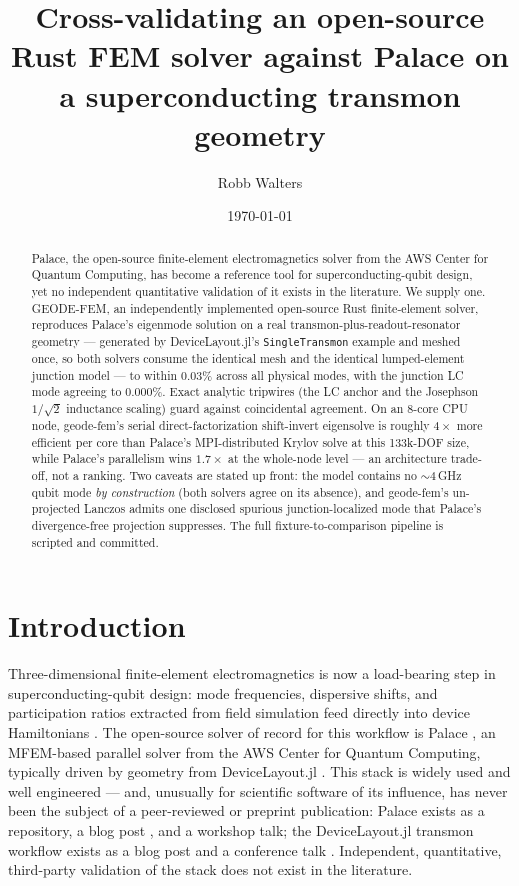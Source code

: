 \documentclass{anvil-paper}
\title{Cross-validating an open-source Rust FEM solver against Palace on a
superconducting transmon geometry}
\author{Robb Walters}
\date{\today}
\begin{document}
\maketitle

\begin{abstract}
Palace, the open-source finite-element electromagnetics solver from the AWS
Center for Quantum Computing, has become a reference tool for
superconducting-qubit design, yet no independent quantitative validation of
it exists in the literature. We supply one. GEODE-FEM, an independently
implemented open-source Rust finite-element solver, reproduces Palace's
eigenmode solution on a real transmon-plus-readout-resonator geometry ---
generated by DeviceLayout.jl's \texttt{SingleTransmon} example and meshed
once, so both solvers consume the identical mesh and the identical
lumped-element junction model --- to within $0.03\%$ across all physical
modes, with the junction LC mode agreeing to $0.000\%$. Exact analytic
tripwires (the LC anchor and the Josephson $1/\sqrt{2}$ inductance scaling)
guard against coincidental agreement. On an 8-core CPU node, geode-fem's
serial direct-factorization shift-invert eigensolve is roughly $4\times$
more efficient per core than Palace's MPI-distributed Krylov solve at this
133k-DOF size, while Palace's parallelism wins $1.7\times$ at the whole-node
level --- an architecture trade-off, not a ranking. Two caveats are stated
up front: the model contains no ${\sim}4$\,GHz qubit mode \emph{by
construction} (both solvers agree on its absence), and geode-fem's
un-projected Lanczos admits one disclosed spurious junction-localized mode
that Palace's divergence-free projection suppresses. The full
fixture-to-comparison pipeline is scripted and committed.
\end{abstract}

\section{Introduction}
\label{sec:intro}

Three-dimensional finite-element electromagnetics is now a load-bearing step
in superconducting-qubit design: mode frequencies, dispersive shifts, and
participation ratios extracted from field simulation feed directly into
device Hamiltonians \citep{koch2007,nigg2012,minev2021}. The open-source
solver of record for this workflow is Palace \citep{palace}, an MFEM-based
\citep{mfem,andrej2024high} parallel solver from the AWS Center for Quantum
Computing, typically driven by geometry from DeviceLayout.jl
\citep{devicelayout,devicelayout-blog}. This stack is widely used and
well engineered --- and, unusually for scientific software of its
influence, has never been the subject of a peer-reviewed or preprint
publication: Palace exists as a repository, a blog post
\citep{palace-blog}, and a workshop talk; the DeviceLayout.jl transmon
workflow exists as a blog post and a conference talk
\citep{devicelayout-blog,devicelayout-juliacon}. Independent, quantitative,
third-party validation of the stack does not exist in the literature.
\end{document}
